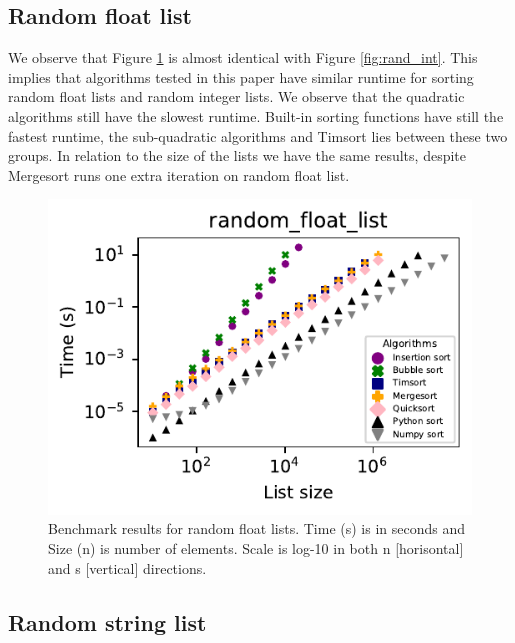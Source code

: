 \documentclass[sigconf, nonacm, natbib, screen, balance=False]{acmart}
\begin{document}
\subsection{Random float list}

We observe that Figure \ref{fig:random float} is almost identical with Figure \ref{fig:rand_int}. This implies that algorithms tested in this paper have similar runtime for sorting random float lists and random integer lists. We observe that the quadratic algorithms still have the slowest runtime. Built-in sorting functions have still the fastest runtime, the sub-quadratic algorithms and Timsort lies between these two groups. In relation to the size of the lists we have the same results, despite Mergesort runs one extra iteration on random float list.


\begin{figure}[h!]
  \includegraphics[width=\linewidth]{../figures/random_float_list.pdf}
  \caption{Benchmark results for random float lists. Time (s) is in seconds and Size (n) is number of elements. Scale is log-10 in both n [horisontal] and s [vertical] directions.}
  \label{fig:random float}
\end{figure}
\FloatBarrier


\subsection{Random string list}
\end{document}
